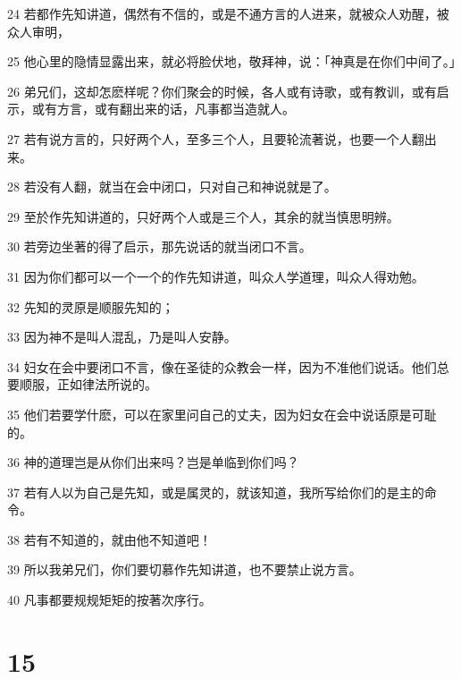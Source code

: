 \par 24 若都作先知讲道，偶然有不信的，或是不通方言的人进来，就被众人劝醒，被众人审明，
\par 25 他心里的隐情显露出来，就必将脸伏地，敬拜神，说：「神真是在你们中间了。」
\par 26 弟兄们，这却怎麽样呢？你们聚会的时候，各人或有诗歌，或有教训，或有启示，或有方言，或有翻出来的话，凡事都当造就人。
\par 27 若有说方言的，只好两个人，至多三个人，且要轮流著说，也要一个人翻出来。
\par 28 若没有人翻，就当在会中闭口，只对自己和神说就是了。
\par 29 至於作先知讲道的，只好两个人或是三个人，其余的就当慎思明辨。
\par 30 若旁边坐著的得了启示，那先说话的就当闭口不言。
\par 31 因为你们都可以一个一个的作先知讲道，叫众人学道理，叫众人得劝勉。
\par 32 先知的灵原是顺服先知的；
\par 33 因为神不是叫人混乱，乃是叫人安静。
\par 34 妇女在会中要闭口不言，像在圣徒的众教会一样，因为不准他们说话。他们总要顺服，正如律法所说的。
\par 35 他们若要学什麽，可以在家里问自己的丈夫，因为妇女在会中说话原是可耻的。
\par 36 神的道理岂是从你们出来吗？岂是单临到你们吗？
\par 37 若有人以为自己是先知，或是属灵的，就该知道，我所写给你们的是主的命令。
\par 38 若有不知道的，就由他不知道吧！
\par 39 所以我弟兄们，你们要切慕作先知讲道，也不要禁止说方言。
\par 40 凡事都要规规矩矩的按著次序行。

\chapter{15}

